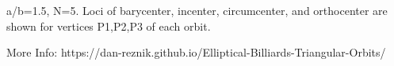 a/b=1.5, N=5. Loci of barycenter, incenter, circumcenter, and orthocenter are shown for vertices P1,P2,P3 of each orbit.

More Info: https://dan-reznik.github.io/Elliptical-Billiards-Triangular-Orbits/